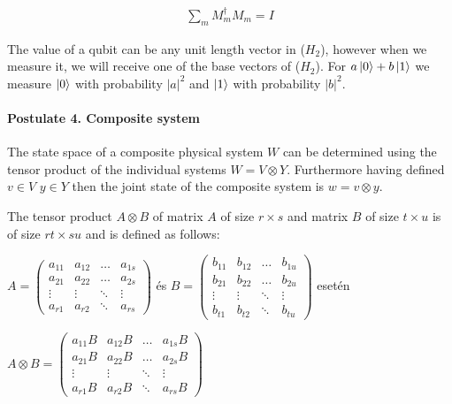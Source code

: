 \begin{align}
    \sum\limits_{m}  M_m^{\dagger} M_m = I
\end{align}

The value of a qubit can be any unit length vector in ($H_2$), however when we measure it, we will receive one
of the base vectors of ($H_2$). For $a\ket{0} + b\ket{1}$ we measure $\ket{0}$ with probability $|a|^2$ and $\ket{1}$ with probability $|b|^2$.

\paragraph{Postulate 4. Composite system}
The state space of a composite physical system $W$ can be determined using the tensor product of the individual systems $W = V \otimes Y$. Furthermore having defined $v \in V$ $y \in Y$ then the joint state of the composite system is $w = v \otimes y$.

 The tensor product $A \otimes B$ of matrix $A$ of size $r \times s$ and matrix $B$ of size $t \times u$ is of size $rt \times su$ and is defined as follows:

\begin{center}
  $A = \begin{pmatrix}
      a_{11} & a_{12} & \dots  & a_{1s} \\
      a_{21} & a_{22} & \dots  & a_{2s} \\
      \vdots & \vdots & \ddots & \vdots \\
      a_{r1} & a_{r2} & \ddots & a_{rs}
    \end{pmatrix}
  $
  és
  $B = \begin{pmatrix}
      b_{11} & b_{12} & \dots  & b_{1u} \\
      b_{21} & b_{22} & \dots  & b_{2u} \\
      \vdots & \vdots & \ddots & \vdots \\
      b_{t1} & b_{t2} & \ddots & b_{tu}
    \end{pmatrix}
  $ esetén
\end{center}

\begin{center}
  $A \otimes B = \begin{pmatrix}
      a_{11}B & a_{12}B & \dots  & a_{1s}B \\
      a_{21}B & a_{22}B & \dots  & a_{2s}B \\
      \vdots  & \vdots  & \ddots & \vdots  \\
      a_{r1}B & a_{r2}B & \ddots & a_{rs}B
    \end{pmatrix}
  $
\end{center}


